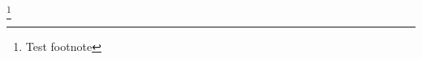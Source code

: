\documentclass[./thoughthist.tex]{subfiles}
\begin{document}
\blindtext\footnote{Test footnote}
\end{document}
